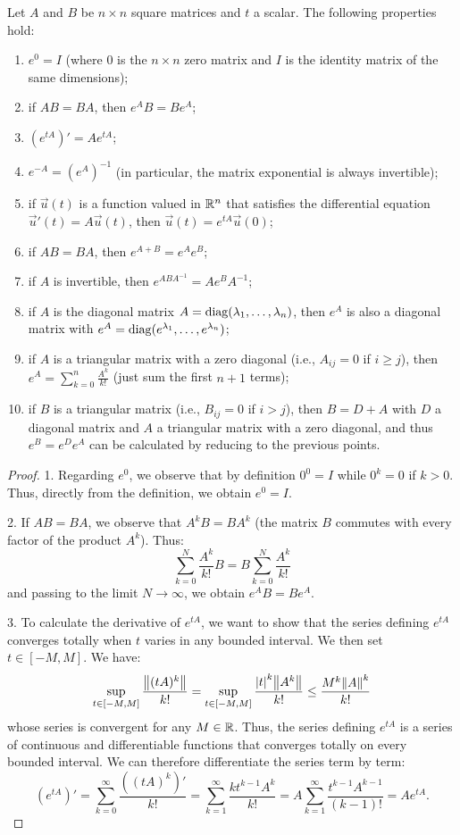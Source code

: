 \begin{theorem}
Let $A$ and $B$ be $n\times n$ square matrices and $t$ a scalar. The following
properties hold:
\begin{enumerate}
\item $e^0 = I$ (where $0$ is the $n\times n$ zero matrix and $I$ is the identity matrix of the same dimensions);
\item if $AB=BA$, then $e^A B = B e^A$;
\item $(e^{tA})' = A e^{tA}$;
\item $e^{-A} = (e^A)^{-1}$ (in particular, the matrix exponential is always invertible);
\item if $\vec u(t)$ is a function valued in ${\mathbb R}^n$ that satisfies the differential equation $\vec u'(t) = A\vec u(t)$, then $\vec u(t) = e^{tA} \vec u(0)$;
\item if $AB=BA$, then $e^{A+B} = e^A e^B$;
\item if $A$ is invertible, then $e^{ABA^{-1}} = Ae^BA^{-1}$;
\item if $A$ is the diagonal matrix $A = \operatorname{diag}(\lambda_1, \dots, \lambda_n)$, then $e^A$ is also a diagonal matrix with $e^A = \operatorname{diag}(e^{\lambda_1},\dots, e^{\lambda_n})$;
\item if $A$ is a triangular matrix with a zero diagonal (i.e., $A_{ij}=0$ if $i\ge j$), then $e^A = \sum_{k=0}^n \frac{A^k}{k!}$ (just sum the first $n+1$ terms);
\item if $B$ is a triangular matrix (i.e., $B_{ij}=0$ if $i > j$), then $B = D + A$ with $D$ a diagonal matrix and $A$ a triangular matrix with a zero diagonal, and thus $e^B = e^De^A$ can be calculated by reducing to the previous points.
\end{enumerate}
\begin{proof}
1. Regarding $e^0$, we observe that by definition $0^0=I$ while $0^k=0$ if
$k>0$. Thus, directly from the definition, we obtain $e^0=I$.

2. If $AB=BA$, we observe that $A^k B=B A^k$ (the matrix $B$ commutes with every
factor of the product $A^k$). Thus:
\[
 \sum_{k=0}^N \frac{A^k}{k!} B = B \sum_{k=0}^N \frac{A^k}{k!}
\]
and passing to the limit $N\to \infty$, we obtain $e^A B = B e^A$.

3. To calculate the derivative of $e^{tA}$, we want to show that the series
defining $e^{tA}$ converges totally when $t$ varies in any bounded interval. We
then set $t\in [-M,M]$. We have:
\[
  \sup_{t\in[-M,M]}\frac{{\left\Vert  (tA)^k\right\Vert}}{k!}
  = \sup_{t\in[-M,M]}\frac{{\left| t\right|}^k {\left\Vert  A^k\right\Vert}}{k!}
  \le \frac{M^k{\left\Vert  A\right\Vert}^k}{k!}
\]
whose series is convergent for any $M\in {\mathbb R}$. Thus, the series defining
$e^{tA}$ is a series of continuous and differentiable functions that converges
totally on every bounded interval. We can therefore differentiate the series
term by term:
\[
(e^{tA})' = \sum_{k=0}^\infty \frac{((tA)^k)'}{k!}
 = \sum_{k=1}^\infty \frac{kt^{k-1} A^k}{k!}
 = A \sum_{k=1}^\infty \frac{t^{k-1}A^{k-1}}{(k-1)!}
 = A e^{tA}.
\]


\end{proof}
\end{theorem}
